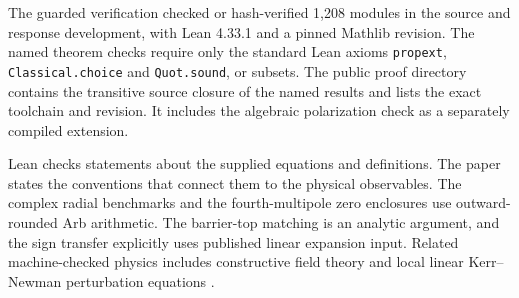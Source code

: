 The guarded verification checked or hash-verified 1,208 modules in
the source and response development, with Lean 4.33.1 and a pinned
Mathlib revision. The named theorem checks require only the standard
Lean axioms \texttt{propext}, \texttt{Classical.choice} and
\texttt{Quot.sound}, or subsets. The public proof directory contains the
transitive source closure of the named results and lists the exact
toolchain and revision. It includes the algebraic polarization check
as a separately compiled extension.

Lean checks statements about the supplied equations and definitions.
The paper states the conventions that connect them to the physical
observables. The complex radial benchmarks and the fourth-multipole
zero enclosures use outward-rounded Arb arithmetic. The barrier-top
matching is an analytic argument, and the sign transfer explicitly
uses published linear expansion input. Related machine-checked
physics includes constructive field theory and local linear
Kerr--Newman perturbation equations \cite{douglas,wang}.
